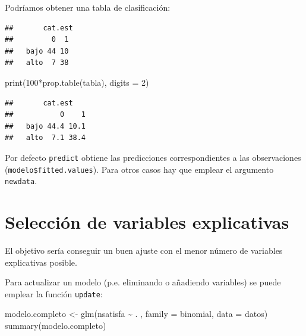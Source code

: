 \documentclass[
]{book}
\newenvironment{Shaded}{\begin{snugshade}}{\end{snugshade}}
\newcommand{\AttributeTok}[1]{\textcolor[rgb]{0.77,0.63,0.00}{#1}}
\newcommand{\DecValTok}[1]{\textcolor[rgb]{0.00,0.00,0.81}{#1}}
\newcommand{\FloatTok}[1]{\textcolor[rgb]{0.00,0.00,0.81}{#1}}
\newcommand{\FunctionTok}[1]{\textcolor[rgb]{0.00,0.00,0.00}{#1}}
\newcommand{\NormalTok}[1]{#1}
\newcommand{\OtherTok}[1]{\textcolor[rgb]{0.56,0.35,0.01}{#1}}
\newcommand{\SpecialCharTok}[1]{\textcolor[rgb]{0.00,0.00,0.00}{#1}}
\theoremstyle{break}
\begin{document}
Podríamos obtener una tabla de clasificación:

\begin{Shaded}
\end{Shaded}

\begin{verbatim}
##       cat.est
##         0  1
##   bajo 44 10
##   alto  7 38
\end{verbatim}

\begin{Shaded}
\begin{Highlighting}[]
\FunctionTok{print}\NormalTok{(}\DecValTok{100}\SpecialCharTok{*}\FunctionTok{prop.table}\NormalTok{(tabla), }\AttributeTok{digits =} \DecValTok{2}\NormalTok{)}
\end{Highlighting}
\end{Shaded}

\begin{verbatim}
##       cat.est
##           0    1
##   bajo 44.4 10.1
##   alto  7.1 38.4
\end{verbatim}

Por defecto \texttt{predict} obtiene las predicciones correspondientes a las observaciones (\texttt{modelo\$fitted.values}). Para otros casos hay que emplear el argumento \texttt{newdata}.

\hypertarget{selecciuxf3n-de-variables-explicativas-1}{%
\section{Selección de variables explicativas}\label{selecciuxf3n-de-variables-explicativas-1}}

El objetivo sería conseguir un buen ajuste con el menor número de variables explicativas posible.

Para actualizar un modelo (p.e. eliminando o añadiendo variables) se puede emplear la función \texttt{update}:

\begin{Shaded}
\begin{Highlighting}[]
\NormalTok{modelo.completo }\OtherTok{\textless{}{-}} \FunctionTok{glm}\NormalTok{(nsatisfa }\SpecialCharTok{\textasciitilde{}}\NormalTok{ . , }\AttributeTok{family =}\NormalTok{ binomial, }\AttributeTok{data =}\NormalTok{ datos)}
\FunctionTok{summary}\NormalTok{(modelo.completo)}
\end{Highlighting}
\end{Shaded}
\end{document}
